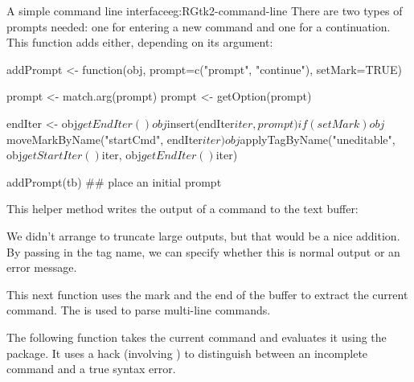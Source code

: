 \begin{example}{A simple command line interface}{eg:RGtk2-command-line}
There are two types of prompts needed: one for entering a new command
and one for a continuation. This function adds either, depending on
its argument:
\begin{Schunk}
\begin{Sinput}
 addPrompt <- function(obj, prompt=c("prompt", "continue"),
                       setMark=TRUE) {
   prompt <- match.arg(prompt)
   prompt <- getOption(prompt)
   
   endIter <- obj$getEndIter()
   obj$insert(endIter$iter, prompt)
   if(setMark)
     obj$moveMarkByName("startCmd", endIter$iter)
   obj$applyTagByName("uneditable", obj$getStartIter()$iter, 
                      obj$getEndIter()$iter)
 }
 addPrompt(tb) ## place an initial prompt
\end{Sinput}
\end{Schunk}

This helper method writes the output of a command to the text
buffer:
\begin{Schunk}
\end{Schunk}
%
We didn't arrange to truncate large outputs, but that would be a nice
addition. By passing in the tag name, we can specify whether this is
normal output or an error message.

This next function uses the  mark and the end of the buffer
to extract the current command. The  is used to parse multi-line commands.
\begin{Schunk}
\end{Schunk}
%

The following function takes the current command and evaluates it
using the  package. It uses a hack (involving
) to distinguish between an incomplete command and a true
syntax error.


\end{example}
